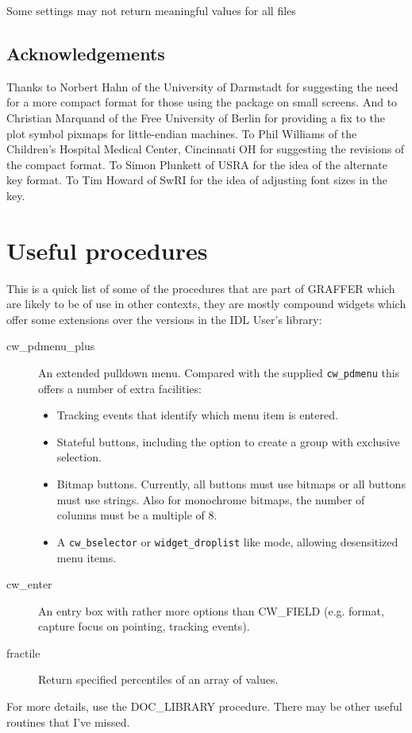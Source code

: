 \documentclass[11pt,twoside,english]{article}
\begin{document}
 
 	Some settings may not return meaningful values for all files



\subsection*{Acknowledgements}

Thanks to Norbert Hahn of the University of Darmstadt for suggesting
the need for a more compact format for those using the package on small
screens. And to Christian Marquand of the Free University of Berlin for
providing a fix to the plot symbol pixmaps for little-endian
machines. To Phil Williams of the Children's Hospital Medical Center,
Cincinnati OH for suggesting the revisions of the compact format. To
Simon Plunkett of USRA for the idea of the alternate key format. To Tim
Howard of SwRI for the idea of adjusting font sizes in the key.

\appendix

\section{Useful procedures}

This is a quick list of some of the procedures that are part of GRAFFER
which are likely to be of use in other contexts, they are mostly
compound widgets which offer some extensions over the versions in the
IDL User's library:

\begin{description}
\item[cw\_pdmenu\_plus] An extended pulldown menu. Compared with the
  supplied \texttt{cw\_pdmenu} this offers a number of extra
  facilities:
  \begin{itemize}
  \item Tracking events that identify which menu item is entered.
  \item Stateful buttons, including the option to create a group with
    exclusive selection.
  \item Bitmap buttons. Currently, all buttons must use bitmaps or all
    buttons must use strings. Also for monochrome bitmaps, the number
    of columns must be a multiple of 8.
  \item A \texttt{cw\_bselector} or \texttt{widget\_droplist} like
    mode, allowing desensitized menu items.
  \end{itemize}
\item [cw\_enter] An entry box with rather more options than
  CW\_FIELD (e.g. format, capture focus on pointing, tracking events).
\item [fractile]Return specified percentiles of an array of values.
\end{description}
For more details, use the DOC\_LIBRARY procedure. There may be other
useful routines that I've missed.
\end{document}
